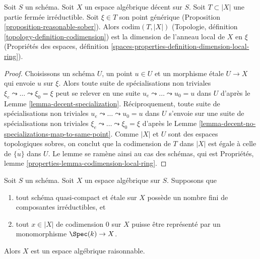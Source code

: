 \begin{lemma}
\label{lemma-codimension-local-ring}
Soit $S$ un schéma. Soit $X$ un espace algébrique décent sur $S$.
Soit $T \subset |X|$ une partie fermée irréductible. Soit $\xi \in T$
son point générique (Proposition \ref{proposition-reasonable-sober}).
Alors $\text{codim}(T, |X|)$
(Topologie, définition \ref{topology-definition-codimension})
est la dimension de l'anneau local de $X$ en $\xi$
(Propriétés des espaces, définition
\ref{spaces-properties-definition-dimension-local-ring}).
\end{lemma}

\begin{proof}
Choisissons un schéma $U$, un point $u \in U$ et un morphisme étale
$U \to X$ qui envoie $u$ sur $\xi$. Alors toute suite de spécialisations non
triviales $\xi_e \leadsto \ldots \leadsto \xi_0 = \xi$ peut se relever en une
suite $u_e \leadsto \ldots \leadsto u_0 = u$ dans $U$ d'après le
Lemme \ref{lemma-decent-specialization}.
Réciproquement, toute suite de spécialisations non triviales
$u_e \leadsto \ldots \leadsto u_0 = u$ dans $U$ s'envoie sur une suite de
spécialisations non triviales
$\xi_e \leadsto \ldots \leadsto \xi_0 = \xi$ d'après le
Lemme \ref{lemma-decent-no-specializations-map-to-same-point}.
Comme $|X|$ et $U$ sont des espaces topologiques sobres, on conclut que la
codimension de $T$ dans $|X|$ est égale à celle de $\overline{\{u\}}$ dans
$U$. Le lemme se ramène ainsi au cas des schémas, qui est
Propriétés, lemme \ref{properties-lemma-codimension-local-ring}.
\end{proof}

\begin{lemma}
\label{lemma-get-reasonable}
Soit $S$ un schéma. Soit $X$ un espace algébrique sur $S$. Supposons que
\begin{enumerate}
\item tout schéma quasi-compact et étale sur $X$ possède un nombre fini de
composantes irréductibles, et
\item tout $x \in |X|$ de codimension $0$ sur $X$ puisse être représenté
par un monomorphisme $\Spec(k) \to X$.
\end{enumerate}
Alors $X$ est un espace algébrique raisonnable.
\end{lemma}

